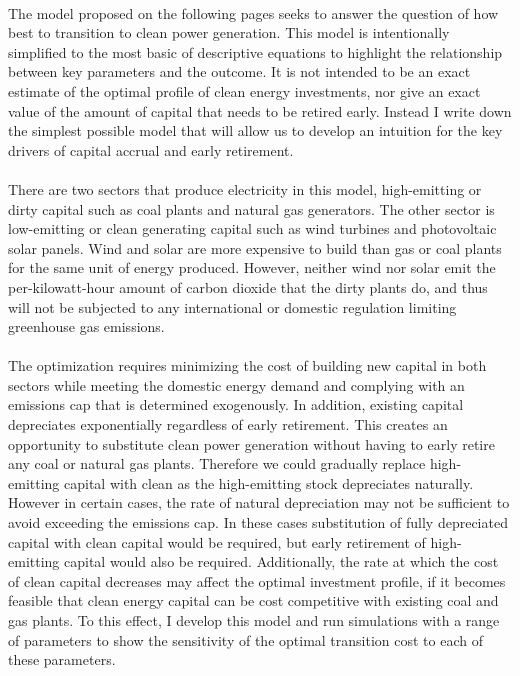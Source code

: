 \documentclass{article}
\begin{document}
\paragraph{} The model proposed on the following pages seeks to answer the question of how best to transition to clean power generation. This model is intentionally simplified to the most basic of descriptive equations to highlight the relationship between key parameters and the outcome. It is not intended to be an exact estimate of the optimal profile of clean energy investments, nor give an exact value of the amount of capital that needs to be retired early. Instead I write down the simplest possible model that will allow us to develop an intuition for the key drivers of capital accrual and early retirement. 

\paragraph{} There are two sectors that produce electricity in this model, high-emitting or dirty capital such as coal plants and natural gas generators. The other sector is low-emitting or clean generating capital such as wind turbines and photovoltaic solar panels. Wind and solar are more expensive to build than gas or coal plants for the same unit of energy produced. However, neither wind nor solar emit the  per-kilowatt-hour amount of carbon dioxide that the dirty plants do, and thus will not be subjected to any international or domestic regulation limiting greenhouse gas emissions. 

\paragraph{} The optimization requires minimizing the cost of building new capital in both sectors while meeting the domestic energy demand and complying with an emissions cap that is determined exogenously. In addition, existing capital depreciates exponentially regardless of early retirement. This creates an opportunity to substitute clean power generation without having to early retire any coal or natural gas plants. Therefore we could gradually replace high-emitting capital with clean as the high-emitting stock depreciates naturally. However in certain cases, the rate of natural depreciation may not be sufficient to avoid exceeding the emissions cap. In these cases substitution of fully depreciated capital with clean capital would be required, but early retirement of high-emitting capital would also be required. Additionally, the rate at which the cost of clean capital decreases may affect the optimal investment profile, if it becomes feasible that clean energy capital can be cost competitive with existing coal and gas plants. To this effect, I develop this model and run simulations with a range of parameters to show the sensitivity of the optimal transition cost to each of these parameters. 
\end{document}

